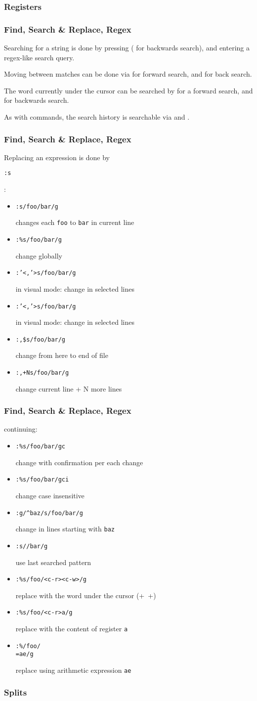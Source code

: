 \documentclass{beamer}
\newcommand{\adown}{$\downarrow$}
\newcommand{\aup}{$\uparrow$}
\newcommand{\key}[1]{\tikz[baseline, yshift=0.75ex]{\node[key] {#1}}}
\newcommand{\thl}[1]{
	\texttt{#1}
}
\newcommand{\tcmd}[1]{
	\thl{:#1}
}
\newcommand{\reg}[1]{
	\texttt{#1}
}
\begin{document}
\begin{frame}
	\frametitle{Registers}
\end{frame}

\begin{frame}
	\frametitle{Find, Search \& Replace, Regex}
	Searching for a string is done by pressing \key{/} (\key{?} for backwards search), and entering a regex-like search query.

	Moving between matches can be done via \key{n} for forward search, and \key{N} for back search.

	The word currently under the cursor can be searched by \key{*} for a forward search, and \key{\#} for backwards search.

	As with commands, the search history is searchable via \key{\aup} and \key{\adown}.
\end{frame}

\begin{frame}
	\frametitle{Find, Search \& Replace, Regex}
	Replacing an expression is done by \tcmd{s}:
	\begin{itemize}
		\item \tcmd{s/foo/bar/g} changes each \thl{foo} to \thl{bar} in current line
		\item \tcmd{\%s/foo/bar/g} change globally
		\item \tcmd{'<,'>s/foo/bar/g} in visual mode: change in selected lines
		\item \tcmd{'<,'>s/foo/bar/g} in visual mode: change in selected lines
		\item \tcmd{,\$s/foo/bar/g} change from here to end of file
		\item \tcmd{,+Ns/foo/bar/g} change current line + N more lines
	\end{itemize}
\end{frame}

\begin{frame}
	\frametitle{Find, Search \& Replace, Regex}
	continuing:

	\begin{itemize}
		\item \tcmd{\%s/foo/bar/gc} change with confirmation per each change
		\item \tcmd{\%s/foo/bar/gci} change case insensitive
		\item \tcmd{g/^baz/s/foo/bar/g} change in lines starting with \hspace{-4pt}\thl{baz}
		\item \tcmd{s//bar/g} use last searched pattern
		\item \tcmd{\%s/foo/<c-r><c-w>/g} replace with the word under the cursor (\key{Ctrl}+\key{r}\ \key{Ctrl}+\key{w})
		\item \tcmd{\%s/foo/<c-r>a/g} replace with the content of register \reg{a}
		\item \tcmd{\%/foo/\\=ae/g} replace using arithmetic expression \thl{ae}
	\end{itemize}
\end{frame}

\begin{frame}
	\frametitle{Splits}
\end{frame}
\end{document}
